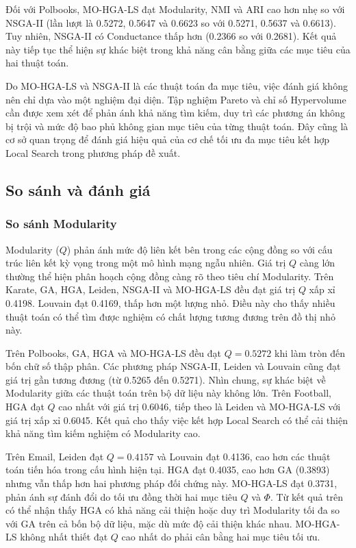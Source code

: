 \documentclass[14pt,a4paper]{extarticle}
\begin{document}
Đối với Polbooks, MO-HGA-LS đạt Modularity, NMI và ARI cao hơn nhẹ so với NSGA-II (lần lượt là 0.5272, 0.5647 và 0.6623 so với 0.5271, 0.5637 và 0.6613). Tuy nhiên, NSGA-II có Conductance thấp hơn (0.2366 so với 0.2681). Kết quả này tiếp tục thể hiện sự khác biệt trong khả năng cân bằng giữa các mục tiêu của hai thuật toán.

Do MO-HGA-LS và NSGA-II là các thuật toán đa mục tiêu, việc đánh giá không nên chỉ dựa vào một nghiệm đại diện. Tập nghiệm Pareto và chỉ số Hypervolume cần được xem xét để phản ánh khả năng tìm kiếm, duy trì các phương án không bị trội và mức độ bao phủ không gian mục tiêu của từng thuật toán. Đây cũng là cơ sở quan trọng để đánh giá hiệu quả của cơ chế tối ưu đa mục tiêu kết hợp Local Search trong phương pháp đề xuất.

\subsection{So sánh và đánh giá}
\subsubsection{So sánh Modularity}

Modularity ($Q$) phản ánh mức độ liên kết bên trong các cộng đồng so với cấu trúc liên kết kỳ vọng trong một mô hình mạng ngẫu nhiên. Giá trị $Q$ càng lớn thường thể hiện phân hoạch cộng đồng càng rõ theo tiêu chí Modularity.
Trên Karate, GA, HGA, Leiden, NSGA-II và MO-HGA-LS đều đạt giá trị $Q$ xấp xỉ 0.4198. Louvain đạt 0.4169, thấp hơn một lượng nhỏ. Điều này cho thấy nhiều thuật toán có thể tìm được nghiệm có chất lượng tương đương trên đồ thị nhỏ này.

Trên Polbooks, GA, HGA và MO-HGA-LS đều đạt $Q = 0.5272$ khi làm tròn đến bốn chữ số thập phân. Các phương pháp NSGA-II, Leiden và Louvain cũng đạt giá trị gần tương đương (từ 0.5265 đến 0.5271). Nhìn chung, sự khác biệt về Modularity giữa các thuật toán trên bộ dữ liệu này không lớn.
Trên Football, HGA đạt $Q$ cao nhất với giá trị 0.6046, tiếp theo là Leiden và MO-HGA-LS với giá trị xấp xỉ 0.6045. Kết quả cho thấy việc kết hợp Local Search có thể cải thiện khả năng tìm kiếm nghiệm có Modularity cao.

Trên Email, Leiden đạt $Q = 0.4157$ và Louvain đạt 0.4136, cao hơn các thuật toán tiến hóa trong cấu hình hiện tại. HGA đạt 0.4035, cao hơn GA (0.3893) nhưng vẫn thấp hơn hai phương pháp đối chứng này. MO-HGA-LS đạt 0.3731, phản ánh sự đánh đổi do tối ưu đồng thời hai mục tiêu $Q$ và $\Phi$.
Từ kết quả trên có thể nhận thấy HGA có khả năng cải thiện hoặc duy trì Modularity tối đa so với GA trên cả bốn bộ dữ liệu, mặc dù mức độ cải thiện khác nhau. MO-HGA-LS không nhất thiết đạt $Q$ cao nhất do phải cân bằng hai mục tiêu tối ưu.
\end{document}
